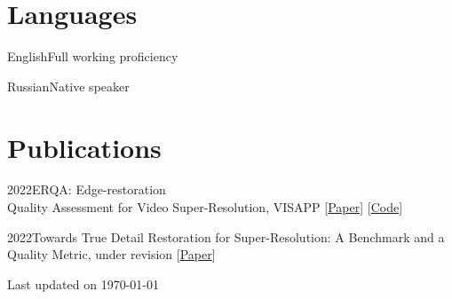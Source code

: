 \documentclass{tccv}
\newcommand{\updateinfo}[1][\today]{\par\vfill\hfill{\scriptsize\color{darkergray}Last updated on #1}}
\begin{document}
\section{Languages}

\begin{factlist}
     \item{English}{Full working proficiency}
     \item{Russian}{Native speaker}
\end{factlist}



\section{Publications}

\begin{factlist}
     \item{2022}{ERQA: Edge-restoration \\ Quality Assessment for Video Super-Resolution, VISAPP [\href{https://arxiv.org/abs/2110.09992}{Paper}] [\href{https://github.com/msu-video-group/ERQA}{Code}]}
     \item{2022}{Towards True Detail Restoration for Super-Resolution: A Benchmark and a Quality Metric, under revision [\href{https://arxiv.org/abs/2203.08923}{Paper}]}
\end{factlist}

\updateinfo
\end{document}
